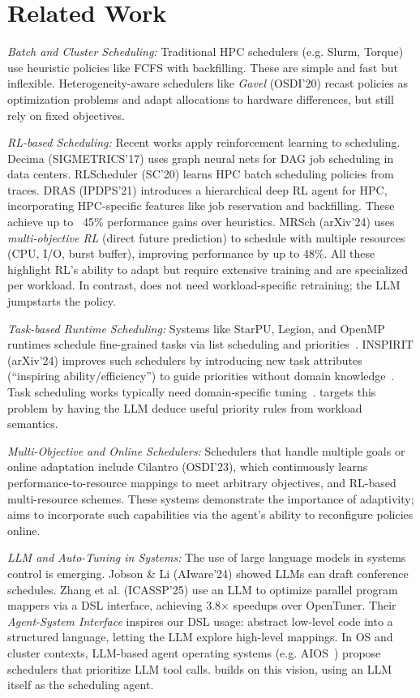 \section{Related Work}

\emph{Batch and Cluster Scheduling:} Traditional HPC schedulers (e.g. Slurm, Torque) use heuristic policies like FCFS with backfilling. These are simple and fast but inflexible. Heterogeneity-aware schedulers like \emph{Gavel} (OSDI'20) recast policies as optimization problems and adapt allocations to hardware differences, but still rely on fixed objectives.

\emph{RL-based Scheduling:} Recent works apply reinforcement learning to scheduling. Decima (SIGMETRICS'17) uses graph neural nets for DAG job scheduling in data centers. RLScheduler (SC'20) learns HPC batch scheduling policies from traces. DRAS (IPDPS'21) introduces a hierarchical deep RL agent for HPC, incorporating HPC-specific features like job reservation and backfilling. These achieve up to ~45\% performance gains over heuristics. MRSch (arXiv'24) uses \emph{multi-objective RL} (direct future prediction) to schedule with multiple resources (CPU, I/O, burst buffer), improving performance by up to 48\%. All these highlight RL's ability to adapt but require extensive training and are specialized per workload. In contrast, \sys{} does not need workload-specific retraining; the LLM jumpstarts the policy.

\emph{Task-based Runtime Scheduling:} Systems like StarPU, Legion, and OpenMP runtimes schedule fine-grained tasks via list scheduling and priorities~\cite{arxiv2404}. INSPIRIT (arXiv'24) improves such schedulers by introducing new task attributes (``inspiring ability/efficiency'') to guide priorities without domain knowledge~\cite{arxiv2404b}. Task scheduling works typically need domain-specific tuning~\cite{arxiv2404c}. \sys{} targets this problem by having the LLM deduce useful priority rules from workload semantics.

\emph{Multi-Objective and Online Schedulers:} Schedulers that handle multiple goals or online adaptation include Cilantro (OSDI'23), which continuously learns performance-to-resource mappings to meet arbitrary objectives, and RL-based multi-resource schemes. These systems demonstrate the importance of adaptivity; \sys{} aims to incorporate such capabilities via the agent's ability to reconfigure policies online.

\emph{LLM and Auto-Tuning in Systems:} The use of large language models in systems control is emerging. Jobson \& Li (AIware'24) showed LLMs can draft conference schedules. Zhang et al. (ICASSP'25) use an LLM to optimize parallel program mappers via a DSL interface, achieving 3.8$\times$ speedups over OpenTuner. Their \emph{Agent-System Interface} inspires our DSL usage: abstract low-level code into a structured language, letting the LLM explore high-level mappings. In OS and cluster contexts, LLM-based agent operating systems (e.g. AIOS~\cite{arxiv2403}) propose schedulers that prioritize LLM tool calls. \sys{} builds on this vision, using an LLM itself as the scheduling agent.


